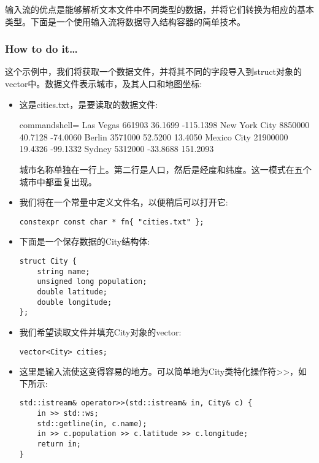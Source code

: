 
输入流的优点是能够解析文本文件中不同类型的数据，并将它们转换为相应的基本类型。下面是一个使用输入流将数据导入结构容器的简单技术。

\subsubsection{How to do it…}

这个示例中，我们将获取一个数据文件，并将其不同的字段导入到struct对象的vector中。数据文件表示城市，及其人口和地图坐标:

\begin{itemize}
\item 
这是cities.txt，是要读取的数据文件:

\begin{tcblisting}{commandshell={}}
Las Vegas
661903 36.1699 -115.1398
New York City
8850000 40.7128 -74.0060
Berlin
3571000 52.5200 13.4050
Mexico City
21900000 19.4326 -99.1332
Sydney
5312000 -33.8688 151.2093
\end{tcblisting}

城市名称单独在一行上。第二行是人口，然后是经度和纬度。这一模式在五个城市中都重复出现。

\item 
我们将在一个常量中定义文件名，以便稍后可以打开它:

\begin{lstlisting}[style=styleCXX]
constexpr const char * fn{ "cities.txt" };
\end{lstlisting}

\item 
下面是一个保存数据的City结构体:

\begin{lstlisting}[style=styleCXX]
struct City {
	string name;
	unsigned long population;
	double latitude;
	double longitude;
};
\end{lstlisting}

\item 
我们希望读取文件并填充City对象的vector:

\begin{lstlisting}[style=styleCXX]
vector<City> cities;
\end{lstlisting}

\item 
这里是输入流使这变得容易的地方。可以简单地为City类特化操作符>{}>，如下所示:

\begin{lstlisting}[style=styleCXX]
std::istream& operator>>(std::istream& in, City& c) {
	in >> std::ws;
	std::getline(in, c.name);
	in >> c.population >> c.latitude >> c.longitude;
	return in;
}
\end{lstlisting}


\end{itemize}
